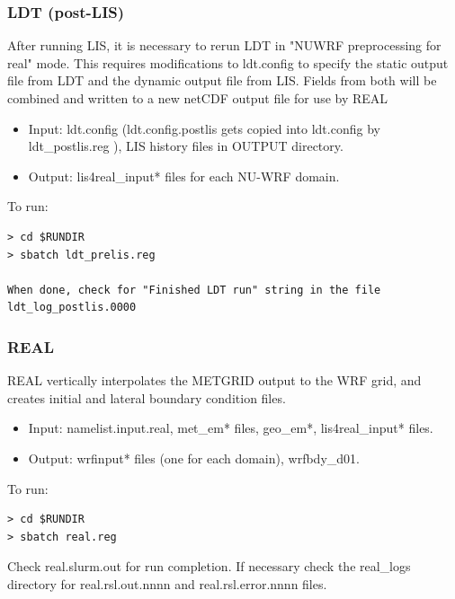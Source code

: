 \begin{frame}[fragile]\frametitle{LDT (post-LIS)}

\footnotesize{
After running LIS, it is necessary to rerun LDT in "NUWRF preprocessing for real" mode. This requires modifications to ldt.config to specify the static output file from LDT and the dynamic output file from LIS. Fields from both will be combined and written to a new netCDF output file for use by REAL
\begin{itemize}
\item Input: ldt.config (ldt.config.postlis gets copied into ldt.config by ldt\_postlis.reg ), LIS history files in OUTPUT directory.
\item Output: lis4real\_input* files for each NU-WRF domain.
\end{itemize}
}    
\hrulefill\par
\footnotesize{To run:}
\begin{lstlisting}
> cd $RUNDIR
> sbatch ldt_prelis.reg

When done, check for "Finished LDT run" string in the file ldt_log_postlis.0000
\end{lstlisting}

\end{frame}


\begin{frame}[fragile]\frametitle{REAL}

\footnotesize{
\hrulefill\par       
REAL vertically interpolates the METGRID output to the WRF grid, and creates initial and lateral boundary condition files.
\begin{itemize}
\item Input: namelist.input.real, met\_em*  files, geo\_em*, lis4real\_input* files.
\item Output: wrfinput* files (one for each domain), wrfbdy\_d01.
\end{itemize}
}    
\hrulefill\par
\footnotesize{To run:}
\begin{lstlisting}
> cd $RUNDIR
> sbatch real.reg
\end{lstlisting}
Check real.slurm.out for run completion.
If necessary check the real\_logs directory for real.rsl.out.nnnn and real.rsl.error.nnnn files.


\end{frame}

